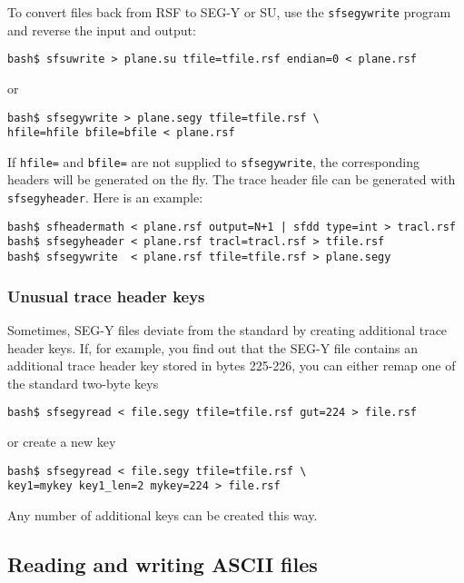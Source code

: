 
To convert files back from RSF to SEG-Y or SU, use the \texttt{sfsegywrite}
program and reverse the input and output:
\begin{verbatim}
bash$ sfsuwrite > plane.su tfile=tfile.rsf endian=0 < plane.rsf
\end{verbatim}
or
\begin{verbatim}
bash$ sfsegywrite > plane.segy tfile=tfile.rsf \
hfile=hfile bfile=bfile < plane.rsf
\end{verbatim}

If \texttt{hfile=} and \texttt{bfile=} are not supplied to
\texttt{sfsegywrite}, the corresponding headers will be generated on
the fly. The trace header file can be generated with
\texttt{sfsegyheader}. Here is an example:
\begin{verbatim}
bash$ sfheadermath < plane.rsf output=N+1 | sfdd type=int > tracl.rsf
bash$ sfsegyheader < plane.rsf tracl=tracl.rsf > tfile.rsf
bash$ sfsegywrite  < plane.rsf tfile=tfile.rsf > plane.segy
\end{verbatim}

\subsubsection{Unusual trace header keys}

Sometimes, SEG-Y files deviate from the standard by creating additional
trace header keys. If, for example, you find out that the SEG-Y file
contains an additional trace header key stored in bytes 225-226, you
can either remap one of the standard two-byte keys
\begin{verbatim}
bash$ sfsegyread < file.segy tfile=tfile.rsf gut=224 > file.rsf
\end{verbatim}
or create a new key
\begin{verbatim}
bash$ sfsegyread < file.segy tfile=tfile.rsf \
key1=mykey key1_len=2 mykey=224 > file.rsf
\end{verbatim}
Any number of additional keys can be created this way.

\subsection{Reading and writing ASCII files}

